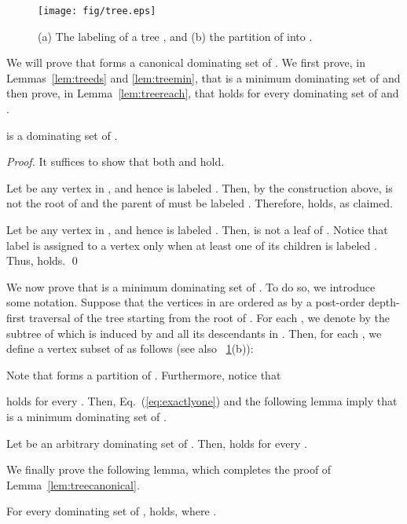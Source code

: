 \documentclass{llncs}
\begin{document}
\begin{figure}[t]
	\centering
		\texttt{[image: fig/tree.eps]}
		\vspace{-1em}
		\caption{(a) The labeling of a tree , and (b) the partition of  into .}
		\vspace{-1em}
	\label{fig:tree}
\end{figure}

We will prove that  forms a canonical dominating set of .
We first prove, in Lemmas~\ref{lem:treeds} and \ref{lem:treemin}, that  is a minimum dominating set of 
and then prove, in Lemma~\ref{lem:treereach}, that  holds
for every dominating set  of  and .

\begin{lemma} \label{lem:treeds}
 is a dominating set of .
\end{lemma}

\begin{proof}
It suffices to show that both  and  hold.

Let  be any vertex in , and hence  is labeled .
Then, by the construction above,  is not the root of  and the parent of  must be labeled .
Therefore,  holds, as claimed.

Let  be any vertex in , and hence  is labeled .
Then,  is not a leaf of . Notice that label  is assigned to a
vertex only when at least one of its children is labeled .
Thus,  holds.
\qed
\end{proof}

We now prove that  is a minimum dominating set of .
To do so, we introduce some notation.
Suppose that the vertices in  are ordered as  by
a post-order depth-first traversal of the tree starting from the root  of .
For each , we denote by  the subtree
of  which is induced by  and all its descendants in .
Then, for each , we define a vertex subset  of  as follows
(see also \figurename~\ref{fig:tree}(b)):



\noindent
Note that  forms a partition of .
Furthermore, notice that

holds for every .
Then, Eq.~(\ref{eq:exactlyone}) and the following lemma imply that  is a minimum dominating set of .

\begin{lemma}[*]\label{lem:treemin}
Let  be an arbitrary dominating set of .
Then,  holds for every .
\end{lemma}

We finally prove the following lemma, which completes the proof of Lemma~\ref{lem:treecanonical}.
\begin{lemma}[*]\label{lem:treereach}
For every dominating set  of ,  holds, where .
\end{lemma}
\end{document}

